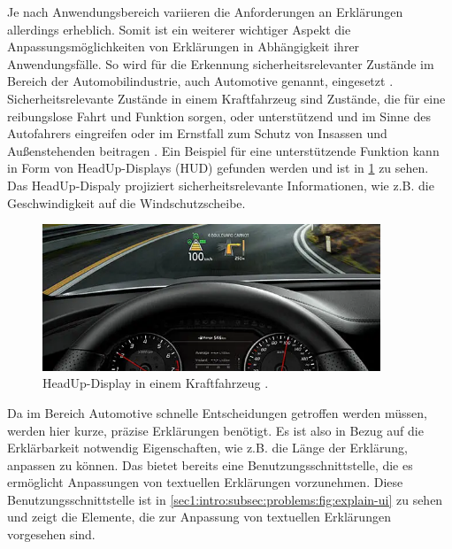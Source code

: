Je nach Anwendungsbereich variieren die Anforderungen an Erklärungen allerdings erheblich.
Somit ist ein weiterer wichtiger Aspekt die Anpassungsmöglichkeiten von Erklärungen in Abhängigkeit ihrer Anwendungsfälle.
So wird \smmir{} für die Erkennung sicherheitsrelevanter Zustände im Bereich der Automobilindustrie, auch Automotive genannt, eingesetzt \cite{jour-smmir}.
Sicherheitsrelevante Zustände in einem Kraftfahrzeug sind Zustände, die für eine reibungslose Fahrt und Funktion sorgen, oder unterstützend und im Sinne des Autofahrers eingreifen oder im Ernstfall zum Schutz von Insassen und Außenstehenden beitragen \cite{kfz-safety-states}.
Ein Beispiel für eine unterstützende Funktion kann in Form von HeadUp-Displays (HUD) gefunden werden und ist in \cref{sec1:intro:subsec:problems:fig:automotive-hud} zu sehen. Das HeadUp-Dispaly projiziert sicherheitsrelevante Informationen, wie z.B. die Geschwindigkeit auf die Windschutzscheibe.
\begin{figure}[htb]
    \centering
    \includegraphics[width=0.9\textwidth]{resources/images/automotive-hud.png}
    \caption{HeadUp-Display in einem Kraftfahrzeug \cite{head-up-display}.}
    \label{sec1:intro:subsec:problems:fig:automotive-hud}
\end{figure}
Da im Bereich Automotive schnelle Entscheidungen getroffen werden müssen, werden hier kurze, präzise Erklärungen benötigt.
Es ist also in Bezug auf die Erklärbarkeit notwendig Eigenschaften, wie z.B. die Länge der Erklärung, anpassen zu können.
Das \gmaf{} bietet bereits eine Benutzungsschnittstelle, die es ermöglicht Anpassungen von textuellen Erklärungen vorzunehmen. Diese Benutzungsschnittstelle ist in \cref{sec1:intro:subsec:problems:fig:explain-ui} zu sehen und zeigt die Elemente, die zur Anpassung von textuellen Erklärungen vorgesehen sind.
